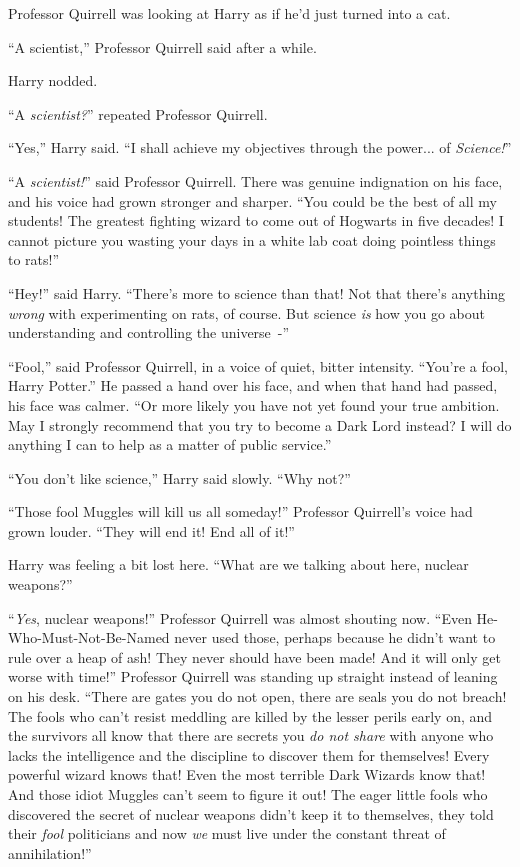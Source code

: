 Professor Quirrell was looking at Harry as if he'd just turned into a cat.

``A scientist,'' Professor Quirrell said after a while.

Harry nodded.

``A \emph{scientist?}'' repeated Professor Quirrell.

``Yes,'' Harry said. ``I shall achieve my objectives through the power... of \emph{Science!}''

``A \emph{scientist!}'' said Professor Quirrell. There was genuine indignation on his face, and his voice had grown stronger and sharper. ``You could be the best of all my students! The greatest fighting wizard to come out of Hogwarts in five decades! I cannot picture you wasting your days in a white lab coat doing pointless things to rats!''

``Hey!'' said Harry. ``There's more to science than that! Not that there's anything \emph{wrong} with experimenting on rats, of course. But science \emph{is} how you go about understanding and controlling the universe~-''

``Fool,'' said Professor Quirrell, in a voice of quiet, bitter intensity. ``You're a fool, Harry Potter.'' He passed a hand over his face, and when that hand had passed, his face was calmer. ``Or more likely you have not yet found your true ambition. May I strongly recommend that you try to become a Dark Lord instead? I will do anything I can to help as a matter of public service.''

``You don't like science,'' Harry said slowly. ``Why not?''

``Those fool Muggles will kill us all someday!'' Professor Quirrell's voice had grown louder. ``They will end it! End all of it!''

Harry was feeling a bit lost here. ``What are we talking about here, nuclear weapons?''

``\emph{Yes}, nuclear weapons!'' Professor Quirrell was almost shouting now. ``Even He-Who-Must-Not-Be-Named never used those, perhaps because he didn't want to rule over a heap of ash! They never should have been made! And it will only get worse with time!'' Professor Quirrell was standing up straight instead of leaning on his desk. ``There are gates you do not open, there are seals you do not breach! The fools who can't resist meddling are killed by the lesser perils early on, and the survivors all know that there are secrets you \emph{do not share} with anyone who lacks the intelligence and the discipline to discover them for themselves! Every powerful wizard knows that! Even the most terrible Dark Wizards know that! And those idiot Muggles can't seem to figure it out! The eager little fools who discovered the secret of nuclear weapons didn't keep it to themselves, they told their \emph{fool} politicians and now \emph{we} must live under the constant threat of annihilation!''

